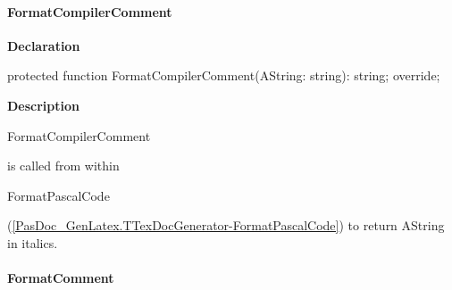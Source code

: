 \documentclass{report}
\newif\ifpdf
\begin{document}
\paragraph*{FormatCompilerComment}\hspace*{\fill}

\label{PasDoc_GenLatex.TTexDocGenerator-FormatCompilerComment}
\begin{list}{}{
\setlength{\itemindent}{0cm}
\setlength{\listparindent}{0cm}
\setlength{\leftmargin}{\evensidemargin}
\addtolength{\leftmargin}{\tmplength}
\settowidth{\labelsep}{X}
\addtolength{\leftmargin}{\labelsep}
\setlength{\labelwidth}{\tmplength}
}
\item[\textbf{Declaration}\hfill]
\ifpdf
\begin{flushleft}
\fi
\begin{ttfamily}
protected function FormatCompilerComment(AString: string): string; override;\end{ttfamily}

\ifpdf
\end{flushleft}
\fi

\par
\item[\textbf{Description}]
\begin{ttfamily}FormatCompilerComment\end{ttfamily} is called from within \begin{ttfamily}FormatPascalCode\end{ttfamily}(\ref{PasDoc_GenLatex.TTexDocGenerator-FormatPascalCode}) to return AString in italics.

\end{list}
\paragraph*{FormatComment}\hspace*{\fill}
\end{document}
